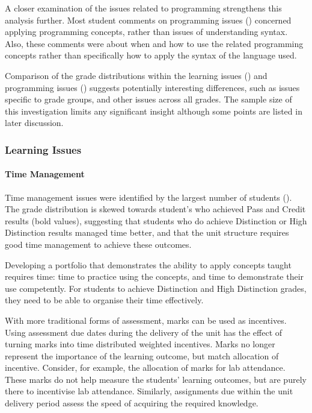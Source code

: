 A closer examination of the issues related to programming strengthens this analysis further. Most student comments on programming issues () concerned applying programming concepts, rather than issues of understanding syntax. Also, these comments were about when and how to use the related programming concepts rather than specifically how to apply the syntax of the language used. 

Comparison of the grade distributions within the learning issues () and programming issues () suggests potentially interesting differences, such as issues specific to grade groups, and other issues across all grades. The sample size of this investigation limits any significant insight although some points are listed in later discussion.


\subsubsection{Learning Issues}

\paragraph{Time Management} %
\label{ssub:time_management}

Time management issues were identified by the largest number of students (). The grade distribution is skewed towards student's who achieved Pass and Credit results (bold values), suggesting that students who do achieve Distinction or High Distinction results managed time better, and that the unit structure requires good time management to achieve these outcomes.

Developing a portfolio that demonstrates the ability to apply concepts taught requires time: time to practice using the concepts, and time to demonstrate their use competently. For students to achieve Distinction and High Distinction grades, they need to be able to organise their time effectively. 

With more traditional forms of assessment, marks can be used as incentives. Using assessment due dates during the delivery of the unit has the effect of turning marks into time distributed weighted incentives. Marks no longer represent the importance of the learning outcome, but match allocation of incentive. Consider, for example, the allocation of marks for lab attendance. These marks do not help measure the students' learning outcomes, but are purely there to incentivise lab attendance. Similarly, assignments due within the unit delivery period assess the speed of acquiring the required knowledge. 

